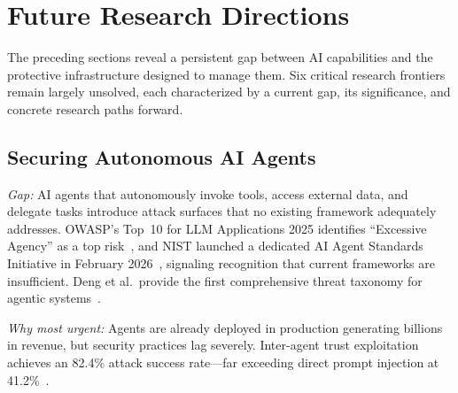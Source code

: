
\section{Future Research Directions}
\label{sec:future}

The preceding sections reveal a persistent gap between AI capabilities and the protective infrastructure designed to manage them. Six critical research frontiers remain largely unsolved, each characterized by a current gap, its significance, and concrete research paths forward.


\subsection{Securing Autonomous AI Agents}
\label{sec:future-agents}

\emph{Gap:} AI agents that autonomously invoke tools, access external data, and delegate tasks introduce attack surfaces that no existing framework adequately addresses. OWASP's Top~10 for LLM Applications 2025 identifies ``Excessive Agency'' as a top risk~\cite{owasp2025}, and NIST launched a dedicated AI Agent Standards Initiative in February 2026~\cite{nist2026agentstandards}, signaling recognition that current frameworks are insufficient. Deng et al.\ provide the first comprehensive threat taxonomy for agentic systems~\cite{deng2025agentthreat}.

\emph{Why most urgent:} Agents are already deployed in production generating billions in revenue, but security practices lag severely. Inter-agent trust exploitation achieves an 82.4\% attack success rate---far exceeding direct prompt injection at 41.2\%~\cite{darkside2025agents}.

